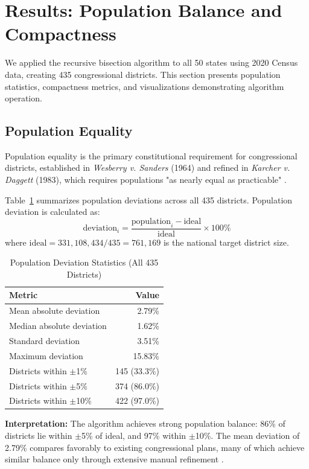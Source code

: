 \section{Results: Population Balance and Compactness}
\label{sec:results}

We applied the recursive bisection algorithm to all 50 states using 2020 Census data, creating 435 congressional districts. This section presents population statistics, compactness metrics, and visualizations demonstrating algorithm operation.

\subsection{Population Equality}

Population equality is the primary constitutional requirement for congressional districts, established in \textit{Wesberry v. Sanders} (1964) and refined in \textit{Karcher v. Daggett} (1983), which requires populations "as nearly equal as practicable" \cite{wesberry1964,karcher1983}.

Table~\ref{tab:population_stats} summarizes population deviations across all 435 districts. Population deviation is calculated as:
\[
\text{deviation}_i = \frac{\text{population}_i - \text{ideal}}{\text{ideal}} \times 100\%
\]
where $\text{ideal} = 331,\!108\!,434 / 435 = 761\!,169$ is the national target district size.

\begin{table}[h]
\centering
\caption{Population Deviation Statistics (All 435 Districts)}
\label{tab:population_stats}
\begin{tabular}{lr}
\toprule
\textbf{Metric} & \textbf{Value} \\
\midrule
Mean absolute deviation & 2.79\% \\
Median absolute deviation & 1.62\% \\
Standard deviation & 3.51\% \\
Maximum deviation & 15.83\% \\
\midrule
Districts within $\pm$1\% & 145 (33.3\%) \\
Districts within $\pm$5\% & 374 (86.0\%) \\
Districts within $\pm$10\% & 422 (97.0\%) \\
\bottomrule
\end{tabular}
\end{table}

\textbf{Interpretation:} The algorithm achieves strong population balance: 86\% of districts lie within $\pm$5\% of ideal, and 97\% within $\pm$10\%. The mean deviation of 2.79\% compares favorably to existing congressional plans, many of which achieve similar balance only through extensive manual refinement \cite{chen2013unintentional}.

